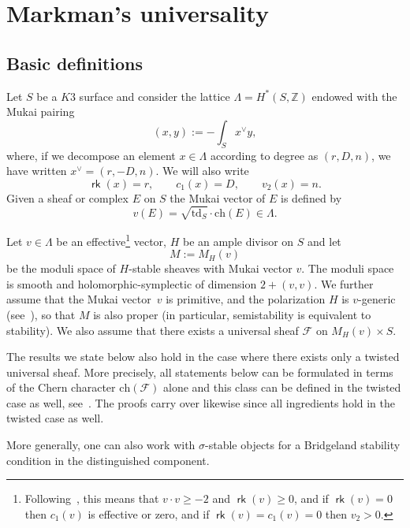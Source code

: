 \documentclass[11pt]{article}
\numberwithin{equation}{section}
\numberwithin{equation}{section}
\newcommand{\BZ}{{\mathbb{Z}}}
\newcommand{\CF}{{\mathcal F}}
\newcommand{\ch}{{\mathrm{ch}}}
\newcommand{\td}{{\mathrm{td}}}
\newcommand{\1}{\mathsf{1}}
\newcommand\rk{\operatorname{\mathsf{rk}}}
\begin{document}
\section{Markman's universality} \label{sec:Markman universality}
\subsection{Basic definitions} %
Let $S$ be a $K3$ surface and consider the lattice $\Lambda = H^{\ast}(S,\BZ)$ endowed with the Mukai pairing
\[
(x , y) := - \int_S x^{\vee} y,
\]
where, if we decompose an element $x \in \Lambda$ according to degree as $(r,D,n)$, we have written $x^{\vee} = (r,-D,n)$.
We will also write
\[
\rk(x) = r, \qquad c_1(x) = D, \qquad v_2(x) = n.
\]
Given a sheaf or complex $E$ on $S$ the Mukai vector of $E$ is defined by
\[
v(E) = \sqrt{\td_S} \cdot \ch(E) \in \Lambda.
\]

Let $v \in \Lambda$ be an effective\footnote{Following~\cite[Definition 1.1]{Markman},
this means that $v \cdot v \geq -2$ and $\rk(v) \geq 0$, and if $\rk(v)=0$ then $c_1(v)$ is effective or zero, and if $\rk(v)=c_1(v)=0$ then $v_2>0$.} vector, $H$ be an ample divisor on $S$
and let
\[
M := M_H(v)
\]
be the moduli space of $H$-stable sheaves with Mukai vector $v$.
The moduli space is smooth and holomorphic-symplectic of dimension $2+(v,v)$.
We further assume that the Mukai vector~$v$ is primitive, and the polarization $H$ is $v$-generic (see~\cite[Theorem~6.2.5]{HL}),
so that $M$ is also proper (in particular, semistability is equivalent to stability).
We also assume that there exists a universal sheaf $\CF$ on $M_H(v) \times S$.

\begin{rmk} \label{rmk:twisted universal sheaf}
The results we state below also hold in the case where there exists only a twisted universal sheaf.
More precisely, all statements below can be formulated
in terms of the Chern character $\ch(\CF)$ alone and this class can be defined in the twisted case as well, see~\cite[Section~3]{MarkmanGenerators}.
The proofs carry over likewise since all ingredients hold in the twisted case as well. %
\end{rmk}
\begin{rmk}
More generally, one can also work with $\sigma$-stable objects for a Bridgeland stability condition in the distinguished component.
\end{rmk}
\end{document}
